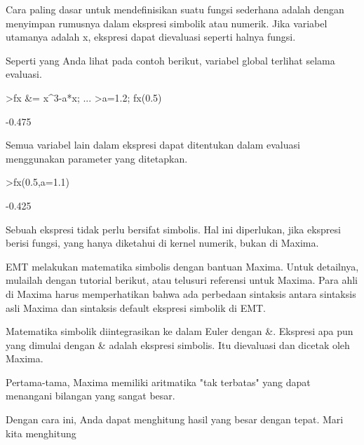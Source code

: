 \begin{eulernotebook}
\begin{eulercomment}
Cara paling dasar untuk mendefinisikan suatu fungsi sederhana adalah
dengan menyimpan rumusnya dalam ekspresi simbolik atau numerik. Jika
variabel utamanya adalah x, ekspresi dapat dievaluasi seperti halnya
fungsi.

Seperti yang Anda lihat pada contoh berikut, variabel global terlihat
selama evaluasi.
\end{eulercomment}
\begin{eulerprompt}
>fx &= x^3-a*x;  ...
>a=1.2; fx(0.5)
\end{eulerprompt}
\begin{euleroutput}
  -0.475
\end{euleroutput}
\begin{eulercomment}
Semua variabel lain dalam ekspresi dapat ditentukan dalam evaluasi
menggunakan parameter yang ditetapkan.
\end{eulercomment}
\begin{eulerprompt}
>fx(0.5,a=1.1)
\end{eulerprompt}
\begin{euleroutput}
  -0.425
\end{euleroutput}
\begin{eulercomment}
Sebuah ekspresi tidak perlu bersifat simbolis. Hal ini diperlukan,
jika ekspresi berisi fungsi, yang hanya diketahui di kernel numerik,
bukan di Maxima. \\

\end{eulercomment}
\begin{eulercomment}

\begin{eulercomment}
\begin{eulercomment}
EMT melakukan matematika simbolis dengan bantuan Maxima. Untuk
detailnya, mulailah dengan tutorial berikut, atau telusuri referensi
untuk Maxima. Para ahli di Maxima harus memperhatikan bahwa ada
perbedaan sintaksis antara sintaksis asli Maxima dan sintaksis default
ekspresi simbolik di EMT.

Matematika simbolik diintegrasikan ke dalam Euler dengan \&. Ekspresi
apa pun yang dimulai dengan \& adalah ekspresi simbolis. Itu dievaluasi
dan dicetak oleh Maxima.

Pertama-tama, Maxima memiliki aritmatika "tak terbatas" yang dapat
menangani bilangan yang sangat besar.
\end{eulercomment}
\begin{eulercomment}
Dengan cara ini, Anda dapat menghitung hasil yang besar dengan tepat.
Mari kita menghitung


\end{eulercomment}
\end{eulercomment}
\end{eulercomment}
\end{eulernotebook}
